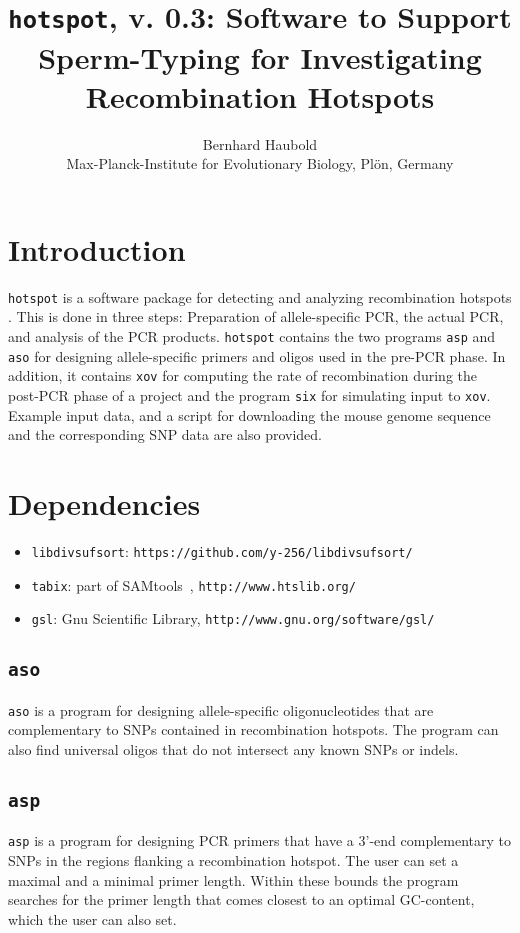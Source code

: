 \documentclass{article}
\newcommand{\bi}{\begin{itemize}}
\newcommand{\ei}{\end{itemize}}
\newcommand{\I}{\item}
\newcommand{\ty}{\texttt}
\newcommand{\version}{0.3}
\begin{document}
\title{\ty{hotspot}, v. \version: Software to Support Sperm-Typing for
Investigating Recombination Hotspots}
\author{Bernhard Haubold\\\small Max-Planck-Institute for Evolutionary Biology, Pl\"on, Germany}
\maketitle
\section{Introduction}
\ty{hotspot} is a software package for detecting and analyzing
recombination hotspots \cite{ode15:hot}. This is done in three steps:
Preparation of allele-specific PCR, the actual PCR, and analysis of
the PCR products. \ty{hotspot} contains the two programs \ty{asp} and \ty{aso} for designing
allele-specific primers and oligos used in the pre-PCR phase. In
addition, it contains \ty{xov} for computing the rate of recombination
during the post-PCR phase of a project and the program \ty{six} for simulating input to \ty{xov}. Example input data, and a script for downloading the mouse
genome sequence and the corresponding SNP data are also provided.

\section{Dependencies}
\bi
\I \ty{libdivsufsort}: \ty{https://github.com/y-256/libdivsufsort/}
\I \ty{tabix}: part of SAMtools~\cite{li09:seq},
\ty{http://www.htslib.org/}
\I \ty{gsl}: Gnu Scientific Library, \ty{http://www.gnu.org/software/gsl/}
\ei

\subsection{\ty{aso}}
\ty{aso} is a program for designing allele-specific oligonucleotides that are
complementary to SNPs contained in recombination hotspots. The program
can also find universal oligos that do not intersect any known SNPs or indels. 

\subsection{\ty{asp}}
\ty{asp} is a program for designing PCR primers that have a 3'-end
complementary to SNPs in the regions flanking a recombination
hotspot. The user can set a maximal and a minimal primer
length. Within these bounds the program searches for the primer length
that comes closest to an optimal GC-content, which the user can also
set.
\end{document}
